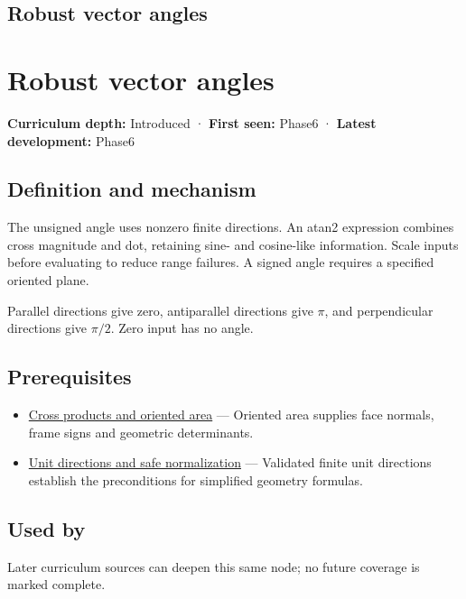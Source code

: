 \hypertarget{appendix-e569e60e18e6}{}
\section*{Robust vector angles}
\chapter{Robust vector angles}\label{appendix-e569e60e18e6-robust-vector-angles}

\textbf{Curriculum depth:} Introduced · \textbf{First seen:} Phase6 · \textbf{Latest development:} Phase6

\section{Definition and mechanism}\label{appendix-e569e60e18e6-definition-and-mechanism}

The unsigned angle uses nonzero finite directions. An atan2 expression combines cross magnitude and dot, retaining sine- and cosine-like information. Scale inputs before evaluating to reduce range failures. A signed angle requires a specified oriented plane.

Parallel directions give zero, antiparallel directions give \(\pi\), and perpendicular directions give \(\pi/2\). Zero input has no angle.

\section{Prerequisites}\label{appendix-e569e60e18e6-prerequisites}

\begin{itemize}
\tightlist
\item
  \hyperref[appendix-2391db8052b1]{Cross products and oriented area} --- Oriented area supplies face normals, frame signs and geometric determinants.
\item
  \hyperref[appendix-f744e41b95b4]{Unit directions and safe normalization} --- Validated finite unit directions establish the preconditions for simplified geometry formulas.
\end{itemize}

\section{Used by}\label{appendix-e569e60e18e6-used-by}

Later curriculum sources can deepen this same node; no future coverage is marked complete.

